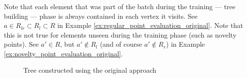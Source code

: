 Note that each element that was part of the batch during the training --- tree building --- phase is always contained in each vertex it visits.
See $a \in R_{lr} \subset R_{l} \subset R$ in Example \ref{ex:regular_point_evaluation_original}.
Note that this is not true for elements unseen during the training phase (such as novelty points).
See $a' \in R$, but $a' \notin R_l$ (and of course $a' \notin R_r$) in Example \ref{ex:novelty_point_evaluation_original}.

\begin{figure}[htbp]
\centering

\caption{Tree constructed using the original approach}
\label{fig:example_noutlier_tree_color}
\end{figure}
